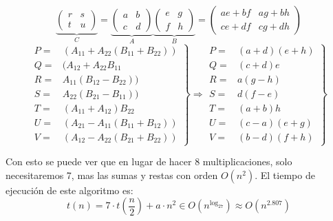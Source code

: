 \documentclass[10pt,a4paper,spanish]{report}
\theoremstyle{definition}
\theoremstyle{remark}
\begin{document}
\begin{displaymath}
    \underbrace{\left(\begin{array}{cc}r & s\\ t & u \end{array} \right)}_C = \underbrace{\left(\begin{array}{cc}a & b\\ c & d \end{array} \right)}_A
    \underbrace{\left(\begin{array}{cc}e & g\\ f & h \end{array} \right)}_B = 
    \left(\begin{array}{cc}ae +bf & ag+bh\\ ce +df & cg+dh \end{array} \right)
\end{displaymath}
\begin{displaymath}
    \left.\begin{array}{cc}
    P = & (A_{11}+A_{22}(B_{11}+B_{22})) \\
    Q = & (A_{12}+A_{22}B_{11} \\
    R = &  A_{11}(B_{12}-B_{22}))\\
    S = &  A_{22}(B_{21}-B_{11}))\\
    T = &  (A_{11}+A_{12})B_{22}\\
    U = &  (A_{21}-A_{11}(B_{11}+B_{12}))\\
    V = &  (A_{12}-A_{22}(B_{21}+B_{22}))
\end{array} \right\}    \Longrightarrow
\left.\begin{array}{cc}
    P = & (a+d)(e+h)\\
    Q = & (c+d)e\\
    R = & a(g-h)\\
    S = & d(f-e)\\
    T = & (a+b)h\\
    U = & (c-a)(e+g)\\
    V = & (b-d)(f+h)
\end{array} \right\}    
\end{displaymath}

Con esto se puede ver que en lugar de hacer 8 multiplicaciones, solo necesitaremos 7, mas las sumas y restas con orden $O(n^2)$. El tiempo de ejecución de este algoritmo es:
\begin{displaymath}
    t(n) = 7\cdot t\left(\frac{n}{2}\right)+a\cdot n^2 \in O(n^{\log_27})\approx O(n^{2.807})
\end{displaymath}
\end{document}

